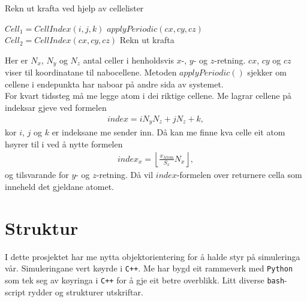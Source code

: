 \documentclass[12pt, a4paper]{article}
\theoremstyle{definition} \newtheorem*{definition}{Teorem}
\begin{document}
        \begin{algorithm}[H]
            \caption{Rekn ut krafta ved hjelp av cellelister}
            \label{Cellelister}
            \begin{algorithmic}[1]
                            \State $Cell_{1} = CellIndex(i, j, k)$
                                        \State $applyPeriodic(cx, cy, cz)$
                                        \State $Cell_{2} = CellIndex(cx, cy, cz)$
                                                \State Rekn ut krafta
                                            \EndFor
                                        \EndFor
                                    \EndFor
                                \EndFor
                            \EndFor
                        \EndFor
                    \EndFor
                \EndFor
            \end{algorithmic}
        \end{algorithm}
        Her er $N_x$, $N_y$ og $N_z$ antal celler i henholdsvis $x$-, $y$- og $z$-retning. $cx$, $cy$ og $cz$ viser til koordinatane til nabocellene. Metoden $applyPeriodic()$ 
        sjekker om cellene i endepunkta har naboar på andre sida av systemet. \\
        For kvart tidssteg må me legge atom i dei riktige cellene. Me lagrar cellene på indeksar gjeve ved formelen
        \begin{align*}
            index = iN_yN_z + jN_z + k,
        \end{align*}
        kor $i$, $j$ og $k$ er indeksane me sender inn. Då kan me finne kva celle eit atom høyrer til i ved å nytte formelen
        \begin{align*}
            index_x = \left \lfloor \frac{x_{\text{Atom}}}{S_{x}} N_{x}\right \rfloor,
        \end{align*}
        og tilsvarande for $y$- og $z$-retning. Då vil $index$-formelen over returnere cella som inneheld det gjeldane atomet.

\newpage
\section*{Struktur}
    I dette prosjektet har me nytta objektorientering for å halde styr på simuleringa vår. Simuleringane vert køyrde i \verb!C++!. Me har bygd eit rammeverk med 
    \verb!Python! som tek seg av køyringa i \verb!C++! for å gje eit betre overblikk. Litt diverse \verb!bash!-script rydder og strukturer utskriftar.
\end{document}
